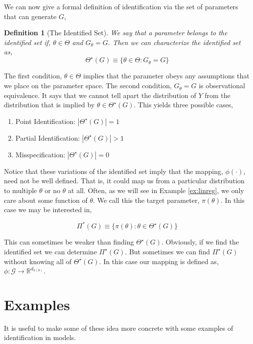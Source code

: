 \documentclass[final,pdftex]{ectaart}
\numberwithin{equation}{section}
\theoremstyle{plain}
\newtheorem{definition}{Definition}[section]
\newcommand{\R}{\mathbb{R}}
\begin{document}
We can now give a formal definition of identification via the set of parameters that can generate $G$,

\begin{definition}[The Identified Set] We say that a parameter belongs to the identified set if, $\theta \in \Theta$ and $G_\theta = G$. Then we can characterize the identified set as,
$$\Theta^\star(G) \equiv \{\theta \in \Theta : G_\theta = G\}$$
\end{definition}

The first condition, $\theta \in \Theta$ implies that the parameter obeys any assumptions that we place on the parameter space. The second condition, $G_\theta = G$ is observational equivalence. It says that we cannot tell apart the distribution of $Y$ from the distribution that is implied by $\theta \in \Theta^\star(G)$. This yields three possible cases,

\begin{enumerate}
\item Point Identification: $|\Theta^\star(G)|=1$
\item Partial Identification: $|\Theta^\star(G)|>1$
\item Misspecification: $|\Theta^\star(G)|=0$
\end{enumerate}

Notice that these variations of the identified set imply that the mapping, $\phi(\cdot)$, need not be well defined. That is, it could map us from a particular distribution to multiple $\theta$ or no $\theta$ at all. Often, as we will see in Example \ref{ex:linreg}, we only care about some function of $\theta$. We call this the target parameter, $\pi(\theta)$. In this case we may be interested in,

$$\Pi^*(G)\equiv\{\pi(\theta):\theta \in \Theta^\star(G)\}$$

This can sometimes be weaker than finding $\Theta^\star(G)$. Obviously, if we find the identified set we can determine $\Pi^\star(G)$. But sometimes we can find $\Pi^\star(G)$ without knowing all of $\Theta^\star(G)$. In this case our mapping is defined as, $\phi:\mathcal{G}\to\R^{d_{\pi(\theta)}}$.

\section{Examples}

It is useful to make some of these idea more concrete with some examples of identification in models.
\end{document}
